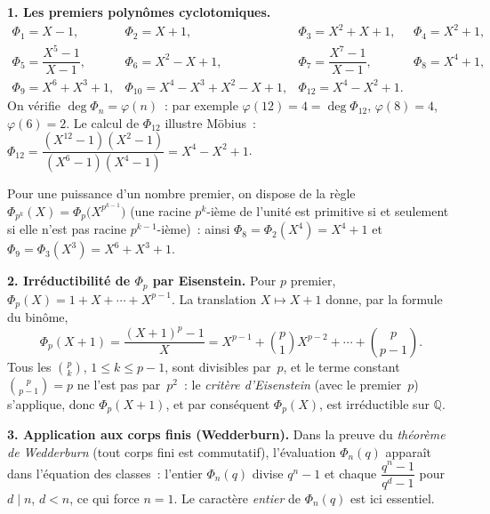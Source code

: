 \begin{mdframed}[style=exbar]
  \textbf{1. Les premiers polynômes cyclotomiques.}
  \[
    \begin{array}{llll}
      \Phi_1=X-1, & \Phi_2=X+1, & \Phi_3=X^2+X+1, & \Phi_4=X^2+1,\\[2pt]
      \Phi_5=\dfrac{X^5-1}{X-1}, & \Phi_6=X^2-X+1, & \Phi_7=\dfrac{X^7-1}{X-1},
        & \Phi_8=X^4+1,\\[6pt]
      \Phi_9=X^6+X^3+1, & \Phi_{10}=X^4-X^3+X^2-X+1, & \Phi_{12}=X^4-X^2+1. &
    \end{array}
  \]
  On vérifie $\deg\Phi_n=\varphi(n)$~: par exemple $\varphi(12)=4=\deg\Phi_{12}$,
  $\varphi(8)=4$, $\varphi(6)=2$. Le calcul de $\Phi_{12}$ illustre Möbius~:
  $\Phi_{12}=\dfrac{(X^{12}-1)(X^2-1)}{(X^6-1)(X^4-1)}=X^4-X^2+1$.

  \smallskip\noindent
  Pour une puissance d'un nombre premier, on dispose de la règle
  $\Phi_{p^k}(X)=\Phi_p\bigl(X^{p^{k-1}}\bigr)$ (une racine $p^k$-ième de
  l'unité est primitive si et seulement si elle n'est pas racine
  $p^{k-1}$-ième)~: ainsi $\Phi_8=\Phi_2(X^4)=X^4+1$ et
  $\Phi_9=\Phi_3(X^3)=X^6+X^3+1$.

  \smallskip\noindent
  \textbf{2. Irréductibilité de $\Phi_p$ par Eisenstein.}\enspace%
  Pour $p$ premier, $\Phi_p(X)=1+X+\cdots+X^{p-1}$. La translation $X\mapsto X+1$
  donne, par la formule du binôme,
  \[
    \Phi_p(X+1)=\frac{(X+1)^p-1}{X}
      =X^{p-1}+\binom{p}{1}X^{p-2}+\cdots+\binom{p}{p-1}.
  \]
  Tous les $\binom{p}{k}$, $1\leq k\leq p-1$, sont divisibles par~$p$, et le
  terme constant $\binom{p}{p-1}=p$ ne l'est pas par~$p^2$~: le \emph{critère
  d'Eisenstein} (avec le premier~$p$) s'applique, donc $\Phi_p(X+1)$, et par
  conséquent $\Phi_p(X)$, est irréductible sur $\mathbb{Q}$.

  \smallskip\noindent
  \textbf{3. Application aux corps finis (Wedderburn).}\enspace
  Dans la preuve du \emph{théorème de Wedderburn} (tout corps fini est
  commutatif), l'évaluation $\Phi_n(q)$ apparaît dans l'équation des classes~:
  l'entier $\Phi_n(q)$ divise $q^n-1$ et chaque $\dfrac{q^n-1}{q^d-1}$ pour
  $d\mid n$, $d<n$, ce qui force $n=1$. Le caractère \emph{entier} de
  $\Phi_n(q)$ est ici essentiel.
\end{mdframed}

\vspace{6pt}

